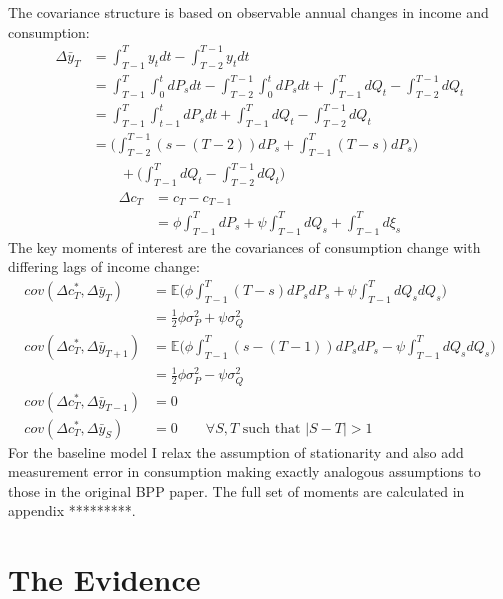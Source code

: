 \documentclass[titlepage]{\econtex}\newcommand{\texname}{BPP_PSID_TimeAgg}
\begin{document}
The covariance structure is based on observable annual changes in income and consumption:
\begin{align}
\Delta \bar{y}_T &= \int_{T-1}^{T} y_t dt - \int_{T-2}^{T-1} y_t dt \nonumber \\ 
&= \int_{T-1}^{T} \int_{0}^{t}dP_s dt -\int_{T-2}^{T-1} \int_{0}^{t}dP_s dt +  \int_{T-1}^{T} dQ_t -\int_{T-2}^{T-1} dQ_t \nonumber \\
&= \int_{T-1}^{T} \int_{t-1}^{t}dP_s dt +  \int_{T-1}^{T} dQ_t -\int_{T-2}^{T-1} dQ_t \nonumber \\
&= \Big(\int_{T-2}^{T-1} (s-(T-2))dP_s  + \int_{T-1}^{T} (T-s)dP_s \Big) \nonumber \\
& \qquad + \Big(\int_{T-1}^{T} dQ_t -\int_{T-2}^{T-1} dQ_t \Big) \label{deltay}
\end{align}
\begin{align}
\Delta c_T &= c_T - c_{T-1} \nonumber  \\
&= \phi  \int_{T-1}^{T} dP_s  +\psi \int_{T-1}^{T}dQ_s +\int_{T-1}^{T}d\xi_s  \label{deltac}
\end{align}
The key moments of interest are the covariances of consumption change with differing lags of income change:
\begin{align}
cov(\Delta c_T^*, \Delta \bar{y}_T) &=  \mathbb{E} \Big( \phi \int_{T-1}^{T} (T-s) dP_s dP_s + \psi \int_{T-1}^{T} dQ_s dQ_s \Big) \nonumber \\
&= \frac{1}{2} \phi \sigma^2_P + \psi \sigma^2_Q \\
cov(\Delta c_T^*, \Delta \bar{y}_{T+1}) &=  \mathbb{E} \Big( \phi \int_{T-1}^{T} (s-(T-1)) dP_s dP_s - \psi \int_{T-1}^{T} dQ_s dQ_s \Big) \nonumber \\
&= \frac{1}{2} \phi \sigma^2_P - \psi \sigma^2_Q \\
cov(\Delta c_T^*, \Delta \bar{y}_{T-1}) &= 0 \\
cov(\Delta c_T^*, \Delta \bar{y}_{S}) &= 0 \qquad \forall S,T \text{ such that }|S-T| >1 
\end{align}
For the baseline model I relax the assumption of stationarity and also add measurement error in consumption making exactly analogous assumptions to those in the original BPP paper. The full set of moments are calculated in appendix *********.
\section{The Evidence}


\processdelayedfloats


%

\pagebreak\appendix

\end{document}

